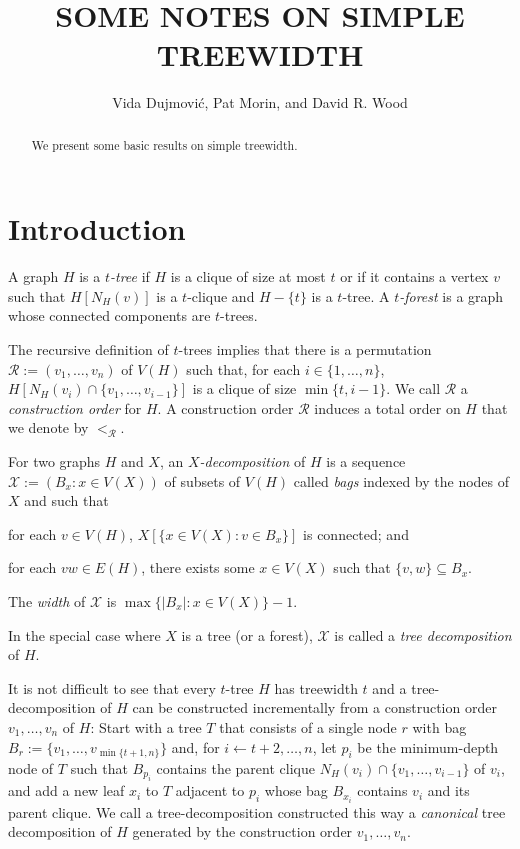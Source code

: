 \documentclass[kpfonts]{patmorin}
\title{\MakeUppercase{Some Notes on Simple Treewidth}}
\author{Vida Dujmović, Pat Morin, and David R. Wood}
\theoremstyle{named}
\begin{document}
\maketitle

\begin{abstract}
  We present some basic results on simple treewidth.
\end{abstract}

\section{Introduction}

A graph $H$ is a \emph{$t$-tree} if $H$ is a clique of size at most $t$ or if it contains a vertex $v$ such that $H[N_H(v)]$ is a $t$-clique and $H-\{t\}$ is a $t$-tree.  A \emph{$t$-forest} is a graph whose connected components are $t$-trees.

The recursive definition of $t$-trees implies that there is a permutation $\mathcal{R}:=(v_1,\ldots,v_n)$ of $V(H)$ such that, for each $i\in\{1,\ldots,n\}$, $H[N_H(v_i)\cap \{v_1,\ldots,v_{i-1}\}]$ is a clique of size $\min\{t,i-1\}$.  We call $\mathcal{R}$ a \emph{construction order} for $H$.  A construction order $\mathcal{R}$ induces a total order on $H$ that we denote by $<_{\mathcal{R}}$.

For two graphs $H$ and $X$, an \emph{$X$-decomposition} of $H$ is a sequence $\mathcal{X}:=(B_x:x\in V(X))$ of subsets of $V(H)$ called \emph{bags} indexed by the nodes of $X$ and such that
 \begin{inparaenum}[(i)]
     \item for each $v\in V(H)$, $X[\{x\in V(X):v\in B_x\}]$ is connected; and
     \item for each $vw\in E(H)$, there exists some $x\in V(X)$ such that $\{v,w\}\subseteq B_x$.
\end{inparaenum}
The \emph{width} of $\mathcal{X}$ is $\max\{|B_x|:x\in V(X)\}-1$.

In the special case where $X$ is a tree (or a forest), $\mathcal{X}$ is called a \emph{tree decomposition} of $H$.

It is not difficult to see that every $t$-tree $H$ has treewidth $t$ and a tree-decomposition of $H$ can be constructed incrementally from a construction order $v_1,\ldots,v_n$ of $H$: Start with a tree $T$ that consists of a single node $r$ with bag $B_r:=\{v_1,\ldots,v_{\min\{t+1,n\}}\}$ and, for $i\gets t+2,\ldots,n$, let $p_i$ be the minimum-depth node of $T$ such that $B_{p_i}$ contains the parent clique $N_H(v_i)\cap\{v_1,\ldots,v_{i-1}\}$ of $v_i$, and add a new leaf $x_i$ to $T$ adjacent to $p_i$ whose bag $B_{x_i}$ contains $v_i$ and its parent clique.  We call a tree-decomposition constructed this way a \emph{canonical} tree decomposition of $H$ generated by the construction order $v_1,\ldots,v_n$.
\end{document}
